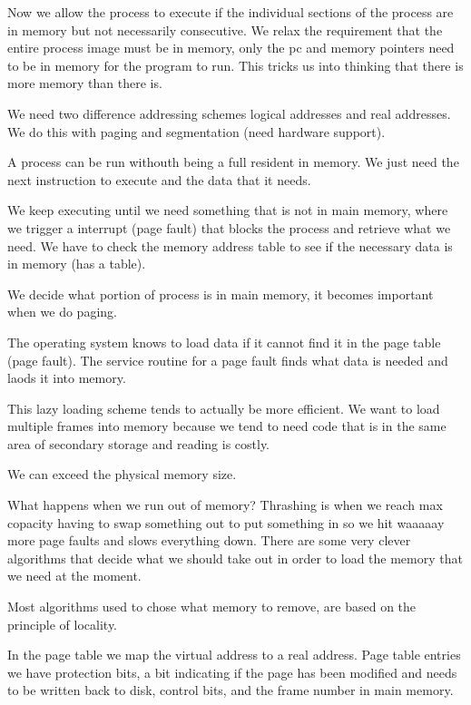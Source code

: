\documentclass{article}
\begin{document}




Now we allow the process to execute if the individual sections of the process are in memory but not necessarily consecutive. We relax the requirement that the entire process image must be in memory, only the pc and memory pointers need to be in memory for the program to run. This tricks us into thinking that there is more memory than there is.

We need two difference addressing schemes logical addresses and real addresses. We do this with paging and segmentation (need hardware support).


A process can be run withouth being a full resident in memory. We just need the next instruction to execute and the data that it needs.

We keep executing until we need something that is not in main memory, where we trigger a interrupt (page fault) that blocks the process and retrieve what we need. We have to check the memory address table to see if the necessary data is in memory (has a table).

We decide what portion of process is in main memory, it becomes important when we do paging.

The operating system knows to load data if it cannot find it in the page table (page fault). The service routine for a page fault finds what data is needed and laods it into memory.

This lazy loading scheme tends to actually be more efficient. We want to load multiple frames into memory because we tend to need code that is in the same area of secondary storage and reading is costly.

We can exceed the physical memory size.



What happens when we run out of memory? Thrashing is when we reach max copacity having to swap something out to put something in so we hit waaaaay more page faults and slows everything down. There are some very clever algorithms that decide what we should take out in order to load the memory that we need at the moment.


Most algorithms used to chose what memory to remove, are based on the principle of locality.


In the page table we map the virtual address to a real address. Page table entries we have protection bits, a bit indicating if the page has been modified and needs to be written back to disk, control bits, and the frame number in main memory.
\end{document}
